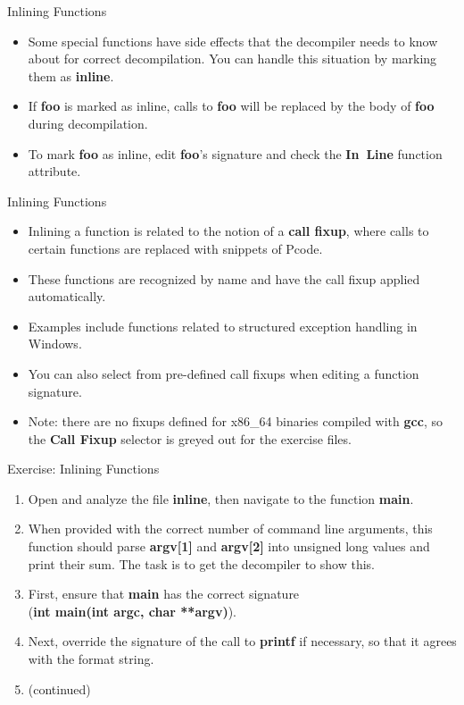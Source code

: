 \documentclass{beamer}
\begin{document}
\begin{frame}
\begin{block}{Inlining Functions}
\begin{itemize}
\item Some special functions have side effects that the decompiler needs to know about for correct decompilation. You can handle this situation by marking them
as \textbf{inline}. 
\item If \textbf{foo} is marked as inline, calls to \textbf{foo} will be replaced by the body of \textbf{foo} during decompilation.
\item To mark \textbf{foo} as inline, edit \textbf{foo}'s signature and check the \textbf{In~Line} function attribute.
\end{itemize}
\end{block}
\end{frame}

\begin{frame}
\begin{block}{Inlining Functions}
\begin{itemize}
\item Inlining a function is related to the notion of a \textbf{call fixup}, where calls to certain functions are replaced with snippets of Pcode.  
\item These functions are recognized by name and have the call fixup applied automatically. 
\item Examples include functions related to structured exception handling in Windows.
\item You can also select from pre-defined call fixups when editing a function signature.
\item Note: there are no fixups defined for x86\_64 binaries compiled with \textbf{gcc}, so the \textbf{Call Fixup} selector is greyed out for the exercise files.
\end{itemize}
\end{block}
\end{frame}

\begin{frame}
\begin{block}{Exercise: Inlining Functions}
\begin{enumerate}
\item Open and analyze the file \textbf{inline}, then navigate to the function \textbf{main}.
\item When provided with the correct number of command line arguments, this function should parse \textbf{argv[1]} and \textbf{argv[2]} into unsigned long values and print their sum.
The task is to get the decompiler to show this.
\item First, ensure that \textbf{main} has the correct signature \\ (\textbf{int main(int argc, char **argv)}).
\item Next, override the signature of the call to \textbf{printf} if necessary, so that it agrees with the format string.
\item[] (continued) 
\end{enumerate}
\end{block}
\end{frame}
\end{document}
